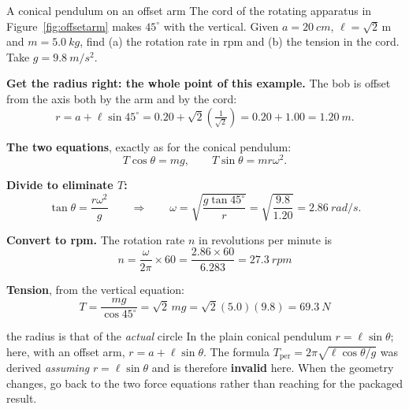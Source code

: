 \begin{exbox}{A conical pendulum on an offset arm}
The cord of the rotating apparatus in Figure~\ref{fig:offsetarm} makes $45^\circ$ with the vertical. Given
$a=\SI{20}{cm}$, $\ell=\sqrt2$\,\si{m} and $m=\SI{5.0}{kg}$, find (a) the rotation rate in rpm and (b) the
tension in the cord. Take $g=\SI{9.8}{m/s^2}$.

 \textbf{Get the radius right: the whole point of this example.} The bob is offset from the
axis both by the arm and by the cord:
\[
r=a+\ell\sin45^\circ=0.20+\sqrt2\left(\tfrac{1}{\sqrt2}\right)=0.20+1.00=\SI{1.20}{m}.
\]

 \textbf{The two equations}, exactly as for the conical pendulum:
\[
T\cos\theta=mg, \qquad T\sin\theta=mr\omega^{2}.
\]

 \textbf{Divide to eliminate $T$:}
\[
\tan\theta=\frac{r\omega^{2}}{g}
\qquad\Longrightarrow\qquad
\omega=\sqrt{\frac{g\tan45^\circ}{r}}=\sqrt{\frac{9.8}{1.20}}=\SI{2.86}{rad/s}.
\]

 \textbf{Convert to rpm.} The rotation rate $n$ in revolutions per minute is
\[
n=\frac{\omega}{2\pi}\times60=\frac{2.86\times60}{6.283}=\boxed{\SI{27.3}{rpm}}
\]

 \textbf{Tension}, from the vertical equation:
\[
T=\frac{mg}{\cos45^\circ}=\sqrt2\,mg=\sqrt2(5.0)(9.8)=\boxed{\SI{69.3}{N}}
\]
\end{exbox}

\begin{trapbox}{the radius is that of the \emph{actual} circle}
In the plain conical pendulum $r=\ell\sin\theta$; here, with an offset arm, $r=a+\ell\sin\theta$. The formula
$T_{\text{per}}=2\pi\sqrt{\ell\cos\theta/g}$ was derived \emph{assuming} $r=\ell\sin\theta$ and is therefore
\textbf{invalid} here. When the geometry changes, go back to the two force equations rather than reaching
for the packaged result.
\end{trapbox}

